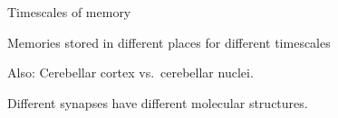 \documentclass[final,hyperref={pdfpagelabels=false,bookmarks=false}]{beamer}
\begin{document}
\begin{frame}{}
\begin{columns}[t]
\begin{column}{0.33\linewidth}
\begin{block}{Timescales of memory}
%
 \parbox[t]{0.47\linewidth}{
 Memories stored in different places for different timescales
 \begin{center}
 \end{center}
 Also: Cerebellar cortex vs.\ cerebellar nuclei.

 }
 \hspace{0.5cm}
 \parbox[t]{0.47\linewidth}{
 Different synapses have different molecular structures.
 \begin{center}
 \end{center}
 }
%
\end{block}


\end{column}

\begin{column}{0.33\linewidth}




\end{column}
\end{columns}
\end{frame}
\end{document}
